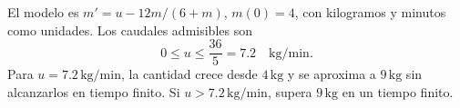 El modelo es \(m'=u-12m/(6+m)\), \(m(0)=4\), con kilogramos y minutos como unidades. Los caudales admisibles son
\[
0\le u\le\frac{36}{5}=7.2\quad\mathrm{kg/min}.
\]
Para \(u=7.2\,\mathrm{kg/min}\), la cantidad crece desde \(4\,\mathrm{kg}\) y se aproxima a \(9\,\mathrm{kg}\) sin alcanzarlos en tiempo finito. Si \(u>7.2\,\mathrm{kg/min}\), supera \(9\,\mathrm{kg}\) en un tiempo finito.
